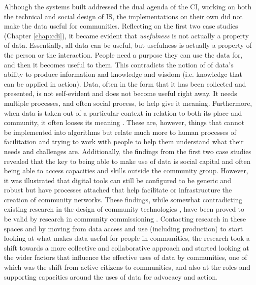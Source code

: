 Although the systems built addressed the dual agenda of the CI, working on both the technical and social design of IS, the implementations on their own did not make the data useful for communities. Reflecting on the first two case studies (Chapter \ref{chap:cdi}), it became evident that \textit{usefulness} is not actually a property of data. Essentially, all data can be useful, but usefulness is actually a property of the person or the interaction. People need a purpose they can use the data for, and then it becomes useful to them. This contradicts the notion of \citet{ackoff_data_1999} of data's ability to produce information and knowledge and wisdom (i.e. knowledge that can be applied in action). Data, often in the form that it has been collected and presented, is not self-evident and does not become useful right away. It needs multiple processes, and often social process, to help give it meaning. Furthermore, when data is taken out of a particular context in relation to both its place and community, it often looses its meaning \citep{hakken_social_2003,gitelman_raw_2013,taylor_data_2014}. These are, however, things that cannot be implemented into algorithms but relate much more to human processes of facilitation and trying to work with people to help them understand what their needs and challenges are. Additionally, the findings from the first two case studies revealed that the key to being able to make use of data is social capital and often being able to access capacities and skills outside the community group. However, it was illustrated that digital tools can still be configured to be generic and robust but have processes attached that help facilitate or infrastructure the creation of community networks. These findings, while somewhat contradicting existing research in the design of community technologies \citep{ehn_participation_2008,dantec_infrastructuring_2013}, have been proved to be valid by research in community commissioning \citep{garbett_app_2016}. Contacting research in these spaces and by moving from data access and use (including production) to start looking at what makes data useful for people in communities, the research took a shift towards a more collective and collaborative approach and started looking at the wider factors that influence the effective uses of data by communities, one of which was the shift from active citizens to communities, and also at the roles and supporting capacities around the uses of data for advocacy and action.

